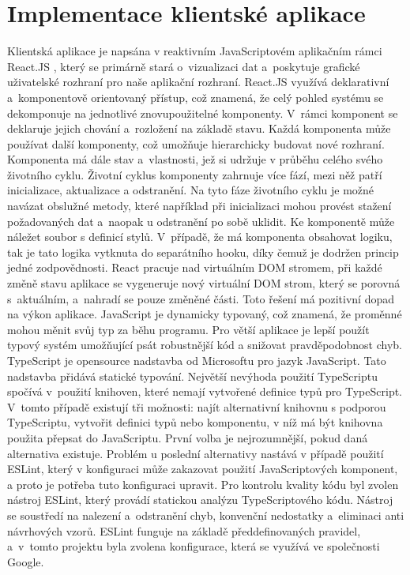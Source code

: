 \section{Implementace klientské aplikace}
Klientská aplikace je napsána v reaktivním JavaScriptovém  aplikačním rámci React.JS \cite{reactDev}, který se primárně stará o~vizualizaci dat a~poskytuje grafické uživatelské rozhraní pro naše aplikační rozhraní. React.JS využívá deklarativní a~komponentově orientovaný přístup, což znamená, že celý pohled systému se dekomponuje na jednotlivé znovupoužitelné komponenty. V~rámci komponent se deklaruje jejich chování a~rozložení na základě stavu. Každá komponenta může používat další komponenty, což umožňuje hierarchicky budovat nové rozhraní. Komponenta má dále stav a~vlastnosti, jež si udržuje v průběhu celého svého životního cyklu. Životní cyklus komponenty zahrnuje více fází, mezi něž patří inicializace, aktualizace a odstranění. Na tyto fáze životního cyklu je možné navázat obslužné metody, které například při inicializaci mohou provést stažení požadovaných dat a~naopak u odstranění po sobě uklidit. Ke komponentě může náležet soubor s definicí stylů. V~případě, že má komponenta obsahovat logiku, tak je tato logika vytknuta do separátního hooku, díky čemuž je dodržen princip jedné zodpovědnosti. React pracuje nad virtuálním DOM stromem, při každé změně stavu aplikace se vygeneruje nový virtuální DOM strom, který se porovná s~aktuálním, a~nahradí se pouze změněné části. Toto řešení má pozitivní dopad na výkon aplikace.
\newpara
JavaScript je dynamicky typovaný, což znamená, že proměnné mohou měnit svůj typ za běhu programu. Pro větší aplikace je lepší použít typový systém umožňující psát robustnější kód a snižovat pravděpodobnost chyb. TypeScript je opensource nadstavba od Microsoftu pro jazyk JavaScript. Tato nadstavba přidává statické typování. Největší nevýhoda použití TypeScriptu spočívá v~použití knihoven, které nemají vytvořené definice typů pro TypeScript. V~tomto případě existují tři možnosti: najít alternativní knihovnu s podporou TypeScriptu, vytvořit definici typů nebo komponentu, v níž má být knihovna použita přepsat do JavaScriptu. První volba je nejrozumnější, pokud daná alternativa existuje. Problém u poslední alternativy nastává v případě použití ESLint, který v konfiguraci může zakazovat použití JavaScriptových komponent, a proto je potřeba tuto konfiguraci upravit.
\newpara
Pro kontrolu kvality kódu byl zvolen nástroj ESLint, který provádí statickou analýzu TypeScriptového kódu. Nástroj se soustředí na nalezení a~odstranění chyb, konvenční nedostatky a~eliminaci anti návrhových vzorů. ESLint funguje na základě předdefinovaných pravidel, a~v~tomto projektu byla zvolena konfigurace, která se využívá ve společnosti Google.
